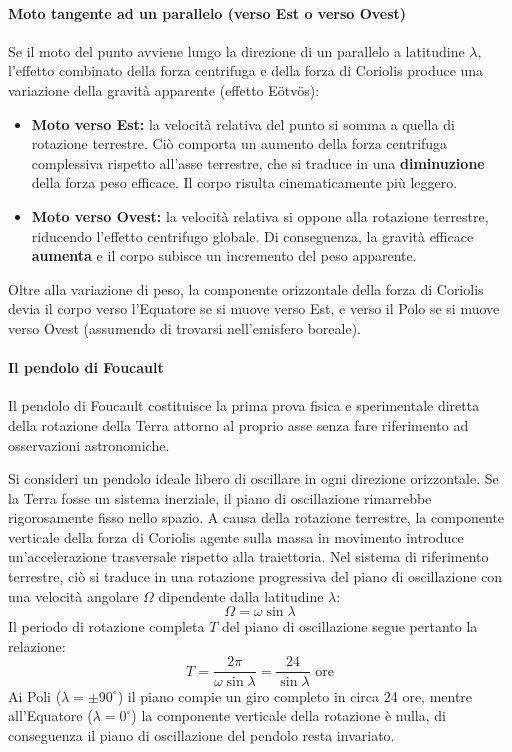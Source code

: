 \documentclass[11pt, a4paper, openright]{book}
\theoremstyle{plain}
\theoremstyle{definition}
\begin{document}
\paragraph{Moto tangente ad un parallelo (verso Est o verso Ovest)}
Se il moto del punto avviene lungo la direzione di un parallelo a latitudine $\lambda$, l'effetto combinato della forza centrifuga e della forza di Coriolis produce una variazione della gravità apparente (effetto Eötvös):
\begin{itemize}
    \item \textbf{Moto verso Est:} la velocità relativa del punto si somma a quella di rotazione terrestre. Ciò comporta un aumento della forza centrifuga complessiva rispetto all'asse terrestre, che si traduce in una \textbf{diminuzione} della forza peso efficace. Il corpo risulta cinematicamente più leggero.
    \item \textbf{Moto verso Ovest:} la velocità relativa si oppone alla rotazione terrestre, riducendo l'effetto centrifugo globale. Di conseguenza, la gravità efficace \textbf{aumenta} e il corpo subisce un incremento del peso apparente.
\end{itemize}
Oltre alla variazione di peso, la componente orizzontale della forza di Coriolis devia il corpo verso l'Equatore se si muove verso Est, e verso il Polo se si muove verso Ovest (assumendo di trovarsi nell'emisfero boreale).

\paragraph{Il pendolo di Foucault}
Il pendolo di Foucault costituisce la prima prova fisica e sperimentale diretta della rotazione della Terra attorno al proprio asse senza fare riferimento ad osservazioni astronomiche. 

Si consideri un pendolo ideale libero di oscillare in ogni direzione orizzontale. Se la Terra fosse un sistema inerziale, il piano di oscillazione rimarrebbe rigorosamente fisso nello spazio. A causa della rotazione terrestre, la componente verticale della forza di Coriolis agente sulla massa in movimento introduce un'accelerazione trasversale rispetto alla traiettoria. Nel sistema di riferimento terrestre, ciò si traduce in una rotazione progressiva del piano di oscillazione con una velocità angolare $\Omega$ dipendente dalla latitudine $\lambda$:
\begin{equation}
    \Omega = \omega \sin\lambda
\end{equation}
Il periodo di rotazione completa $T$ del piano di oscillazione segue pertanto la relazione:
\begin{equation}
    T = \frac{2\pi}{\omega \sin\lambda} = \frac{24}{\sin\lambda} \text{ ore}
\end{equation}
Ai Poli ($\lambda = \pm 90^\circ$) il piano compie un giro completo in circa 24 ore, mentre all'Equatore ($\lambda = 0^\circ$) la componente verticale della rotazione è nulla, di conseguenza il piano di oscillazione del pendolo resta invariato.
\end{document}
